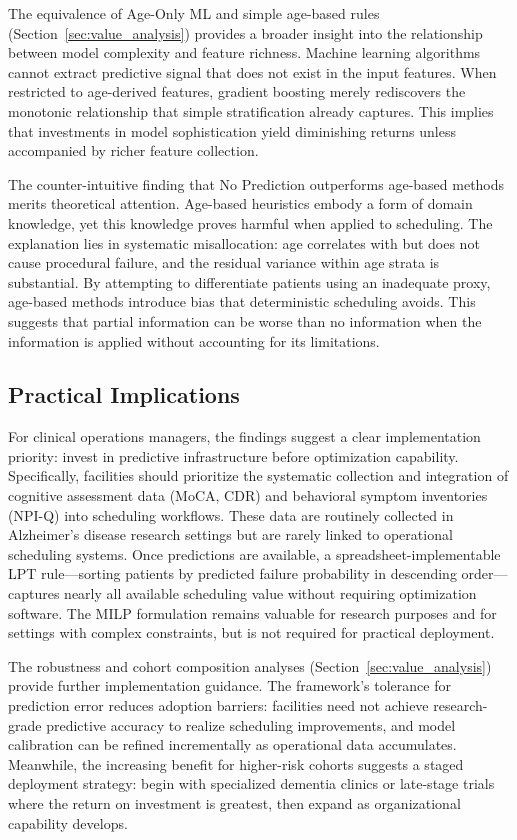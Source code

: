 \documentclass[11pt,a4paper]{article}
\begin{document}
The equivalence of Age-Only ML and simple age-based rules (Section~\ref{sec:value_analysis}) provides a broader insight into the relationship between model complexity and feature richness. Machine learning algorithms cannot extract predictive signal that does not exist in the input features. When restricted to age-derived features, gradient boosting merely rediscovers the monotonic relationship that simple stratification already captures. This implies that investments in model sophistication yield diminishing returns unless accompanied by richer feature collection.

The counter-intuitive finding that No Prediction outperforms age-based methods merits theoretical attention. Age-based heuristics embody a form of domain knowledge, yet this knowledge proves harmful when applied to scheduling. The explanation lies in systematic misallocation: age correlates with but does not cause procedural failure, and the residual variance within age strata is substantial. By attempting to differentiate patients using an inadequate proxy, age-based methods introduce bias that deterministic scheduling avoids. This suggests that partial information can be worse than no information when the information is applied without accounting for its limitations.

\subsection{Practical Implications}

For clinical operations managers, the findings suggest a clear implementation priority: invest in predictive infrastructure before optimization capability. Specifically, facilities should prioritize the systematic collection and integration of cognitive assessment data (MoCA, CDR) and behavioral symptom inventories (NPI-Q) into scheduling workflows. These data are routinely collected in Alzheimer's disease research settings but are rarely linked to operational scheduling systems. Once predictions are available, a spreadsheet-implementable LPT rule---sorting patients by predicted failure probability in descending order---captures nearly all available scheduling value without requiring optimization software. The MILP formulation remains valuable for research purposes and for settings with complex constraints, but is not required for practical deployment.

The robustness and cohort composition analyses (Section~\ref{sec:value_analysis}) provide further implementation guidance. The framework's tolerance for prediction error reduces adoption barriers: facilities need not achieve research-grade predictive accuracy to realize scheduling improvements, and model calibration can be refined incrementally as operational data accumulates. Meanwhile, the increasing benefit for higher-risk cohorts suggests a staged deployment strategy: begin with specialized dementia clinics or late-stage trials where the return on investment is greatest, then expand as organizational capability develops.
\end{document}
